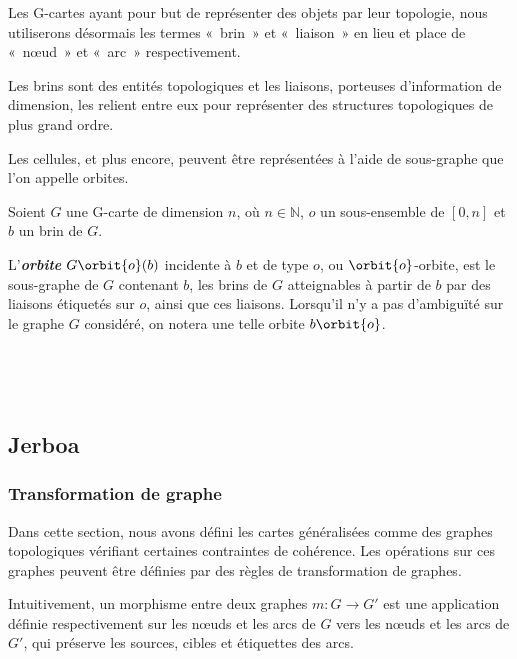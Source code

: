 Les G-cartes ayant pour but de représenter des objets par leur topologie, nous
utiliserons désormais les termes «~brin~» et «~liaison~» en lieu et place de
«~nœud~» et «~arc~» respectivement.


Les brins sont des entités topologiques et les liaisons, porteuses
d'information de dimension, les relient entre eux pour représenter des structures topologiques de plus grand ordre.

Les cellules, et plus encore, peuvent être représentées à l'aide de sous-graphe que l'on appelle orbites.

\begin{definition}[Orbite]
	Soient $G$ une G-carte de dimension $n$, où $n \in \mathbb{N}$, $o$ un sous-ensemble de $[0, n]$ et $b$ un brin de $G$.

	L'\textbf{\emph{orbite}} $G\orbit{o}(b)$ incidente à $b$ et de type $o$,
	ou $\orbit{o}$-orbite, est le sous-graphe de $G$ contenant $b$, les brins
	de $G$ atteignables à partir de $b$ par des liaisons étiquetés sur $o$,
	ainsi que ces liaisons. %
	Lorsqu'il n'y a pas d'ambiguïté sur le graphe $G$
	considéré, on notera une telle orbite $b\orbit{o}$.
\end{definition}

~


~

\subsection[Jerboa]{Jerboa}
\label{sec:etat-art-jerboa}

\cite{belhaouari2014jerboa,gauthier2016topological}

\subsubsection[Transformation de graphe]{Transformation de graphe}
\label{sec:etat-art-jerboa-transformation-graphe}

Dans cette section, nous avons défini les cartes généralisées comme des graphes
topologiques vérifiant certaines contraintes de cohérence. Les opérations sur
ces graphes peuvent être définies par des règles de transformation de graphes.

Intuitivement, un morphisme entre deux graphes $m: G \to G'$ est une application définie  respectivement sur les nœuds et les arcs de $G$ vers les nœuds et les arcs de $G'$, qui préserve les sources, cibles et étiquettes des arcs.

